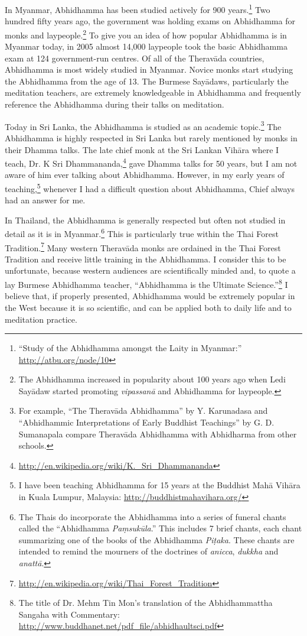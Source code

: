In Myanmar, Abhidhamma has been studied actively for 900 years.\footnote{“Study of the Abhidhamma amongst the Laity in Myanmar:” \url{http://atbu.org/node/10}} Two hundred fifty years ago, the government was holding exams on Abhidhamma for monks and laypeople.\footnote{The Abhidhamma increased in popularity about 100 years ago when Ledi Sayādaw started promoting \textit{vipassanā} and Abhidhamma for laypeople.} To give you an idea of how popular Abhidhamma is in Myanmar today, in 2005 almost 14,000 laypeople took the basic Abhidhamma exam at 124 government-run centres. Of all of the Theravāda countries, Abhidhamma is most widely studied in Myanmar. Novice monks start studying the Abhidhamma from the age of 13. The Burmese Sayādaws, particularly the meditation teachers, are extremely knowledgeable in Abhidhamma and frequently reference the Abhidhamma during their talks on meditation.

Today in Sri Lanka, the Abhidhamma is studied as an academic topic.\footnote{For example, “The Theravāda Abhidhamma” by Y. Karunadasa and “Abhidhammic Interpretations of Early Buddhist Teachings” by G. D. Sumanapala compare Theravāda Abhidhamma with Abhidharma from other schools.} The Abhidhamma is highly respected in Sri Lanka but rarely mentioned by monks in their Dhamma talks. The late chief monk at the Sri Lankan Vihāra where I teach, Dr. K Sri Dhammananda,\footnote{\url{http://en.wikipedia.org/wiki/K._Sri_Dhammananda}} gave Dhamma talks for 50 years, but I am not aware of him ever talking about Abhidhamma. However, in my early years of teaching,\footnote{I have been teaching Abhidhamma for 15 years at the Buddhist Mahā Vihāra in Kuala Lumpur, Malaysia: \url{http://buddhistmahavihara.org/}} whenever I had a difficult question about Abhidhamma, Chief always had an answer for me.

\pagebreak

In Thailand, the Abhidhamma is generally respected but often not studied in detail as it is in Myanmar.\footnote{The Thais do incorporate the Abhidhamma into a series of funeral chants called the “Abhidhamma \textit{Paṃsukūla}.” This includes 7 brief chants, each chant summarizing one of the books of the Abhidhamma \textit{Piṭaka}. These chants are intended to remind the mourners of the doctrines of \textit{anicca}, \textit{dukkha} and \textit{anattā}.} This is particularly true within the Thai Forest Tradition.\footnote{\url{http://en.wikipedia.org/wiki/Thai_Forest_Tradition}} Many western Theravāda monks are ordained in the Thai Forest Tradition and receive little training in the Abhidhamma. I consider this to be unfortunate, because western audiences are scientifically minded and, to quote a lay Burmese Abhidhamma teacher, “Abhidhamma is the Ultimate Science.”\footnote{The title of Dr. Mehm Tin Mon’s translation of the Abhidhammattha Sangaha with Commentary: \url{http://www.buddhanet.net/pdf_file/abhidhaultsci.pdf}} I believe that, if properly presented, Abhidhamma would be extremely popular in the West because it is so scientific, and can be applied both to daily life and to meditation practice.

